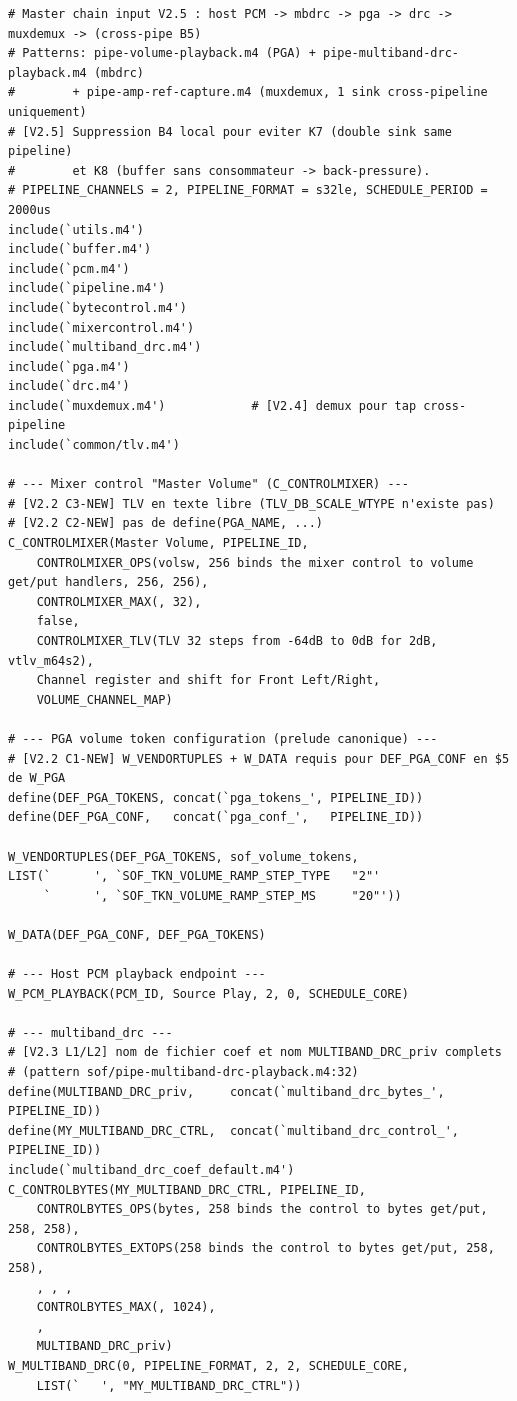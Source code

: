 \documentclass[11pt,a4paper]{article}
\begin{document}
\begin{lstlisting}[language={}, basicstyle=\ttfamily\scriptsize]
# Master chain input V2.5 : host PCM -> mbdrc -> pga -> drc -> muxdemux -> (cross-pipe B5)
# Patterns: pipe-volume-playback.m4 (PGA) + pipe-multiband-drc-playback.m4 (mbdrc)
#        + pipe-amp-ref-capture.m4 (muxdemux, 1 sink cross-pipeline uniquement)
# [V2.5] Suppression B4 local pour eviter K7 (double sink same pipeline)
#        et K8 (buffer sans consommateur -> back-pressure).
# PIPELINE_CHANNELS = 2, PIPELINE_FORMAT = s32le, SCHEDULE_PERIOD = 2000us
include(`utils.m4')
include(`buffer.m4')
include(`pcm.m4')
include(`pipeline.m4')
include(`bytecontrol.m4')
include(`mixercontrol.m4')
include(`multiband_drc.m4')
include(`pga.m4')
include(`drc.m4')
include(`muxdemux.m4')            # [V2.4] demux pour tap cross-pipeline
include(`common/tlv.m4')

# --- Mixer control "Master Volume" (C_CONTROLMIXER) ---
# [V2.2 C3-NEW] TLV en texte libre (TLV_DB_SCALE_WTYPE n'existe pas)
# [V2.2 C2-NEW] pas de define(PGA_NAME, ...)
C_CONTROLMIXER(Master Volume, PIPELINE_ID,
    CONTROLMIXER_OPS(volsw, 256 binds the mixer control to volume get/put handlers, 256, 256),
    CONTROLMIXER_MAX(, 32),
    false,
    CONTROLMIXER_TLV(TLV 32 steps from -64dB to 0dB for 2dB, vtlv_m64s2),
    Channel register and shift for Front Left/Right,
    VOLUME_CHANNEL_MAP)

# --- PGA volume token configuration (prelude canonique) ---
# [V2.2 C1-NEW] W_VENDORTUPLES + W_DATA requis pour DEF_PGA_CONF en $5 de W_PGA
define(DEF_PGA_TOKENS, concat(`pga_tokens_', PIPELINE_ID))
define(DEF_PGA_CONF,   concat(`pga_conf_',   PIPELINE_ID))

W_VENDORTUPLES(DEF_PGA_TOKENS, sof_volume_tokens,
LIST(`		', `SOF_TKN_VOLUME_RAMP_STEP_TYPE	"2"'
     `		', `SOF_TKN_VOLUME_RAMP_STEP_MS		"20"'))

W_DATA(DEF_PGA_CONF, DEF_PGA_TOKENS)

# --- Host PCM playback endpoint ---
W_PCM_PLAYBACK(PCM_ID, Source Play, 2, 0, SCHEDULE_CORE)

# --- multiband_drc ---
# [V2.3 L1/L2] nom de fichier coef et nom MULTIBAND_DRC_priv complets
# (pattern sof/pipe-multiband-drc-playback.m4:32)
define(MULTIBAND_DRC_priv,     concat(`multiband_drc_bytes_',   PIPELINE_ID))
define(MY_MULTIBAND_DRC_CTRL,  concat(`multiband_drc_control_', PIPELINE_ID))
include(`multiband_drc_coef_default.m4')
C_CONTROLBYTES(MY_MULTIBAND_DRC_CTRL, PIPELINE_ID,
    CONTROLBYTES_OPS(bytes, 258 binds the control to bytes get/put, 258, 258),
    CONTROLBYTES_EXTOPS(258 binds the control to bytes get/put, 258, 258),
    , , ,
    CONTROLBYTES_MAX(, 1024),
    ,
    MULTIBAND_DRC_priv)
W_MULTIBAND_DRC(0, PIPELINE_FORMAT, 2, 2, SCHEDULE_CORE,
    LIST(`   ', "MY_MULTIBAND_DRC_CTRL"))


\end{lstlisting}
\end{document}
